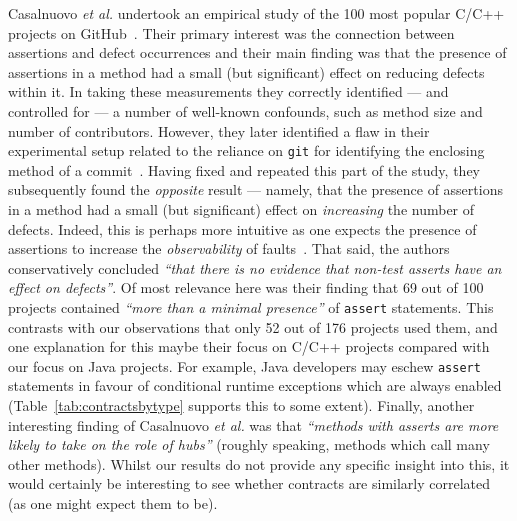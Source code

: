 \documentclass[a4paper,UKenglish]{lipics-v2016}
\begin{document}
Casalnuovo {\em et al.} undertook an empirical study of the 100 most popular C/C++ projects on GitHub~\cite{CDOFR15}.  Their primary interest was the connection between assertions and defect occurrences and their main finding was that the presence of assertions in a method had a small (but significant) effect on reducing defects within it.  In taking these measurements they correctly identified --- and controlled for --- a number of well-known confounds, such as method size and number of contributors.  However, they later identified a flaw in their experimental setup related to the reliance on \verb+git+ for identifying the enclosing method of a commit~\cite{CDFR15}.  Having fixed and repeated this part of the study, they subsequently found the {\em opposite} result --- namely, that the presence of assertions in a method had a small (but significant) effect on {\em increasing} the number of defects.  Indeed, this is perhaps more intuitive as one expects the presence of assertions to increase the {\em observability} of faults~\cite{VM94,CR06}.  That said, the authors conservatively concluded {\em ``that there is no evidence that non-test asserts have an effect on defects''}.  Of most relevance here was their finding that 69 out of 100 projects contained {\em ``more than a minimal presence''} of \texttt{assert} statements.  This contrasts with our observations that only 52 out of 176 projects used them, and one explanation for this maybe their focus on C/C++ projects compared with our focus on Java projects.  For example, Java developers may eschew \texttt{assert} statements in favour of conditional runtime exceptions which are always enabled (Table~\ref{tab:contractsbytype} supports this to some extent).  Finally, another interesting finding of Casalnuovo {\em et al.} was that {\em ``methods with asserts are more likely to take on the role of hubs''} (roughly speaking, methods which call many other methods).  Whilst our results do not provide any specific insight into this, it would certainly be interesting to see whether contracts are similarly correlated (as one might expect them to be).
\end{document}
